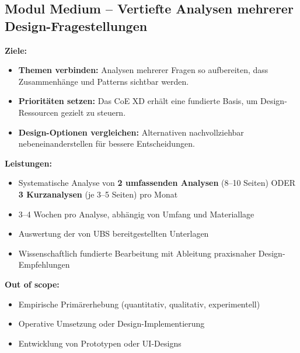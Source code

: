 \documentclass{fehradvice-report}
\begin{document}
\vspace{0.3cm}
\begin{center}
\end{center}

\newpage
\subsection{Modul Medium -- Vertiefte Analysen mehrerer Design-Fragestellungen}

\textbf{Ziele:}
\begin{itemize}
    \item[$\checkmark$] \textbf{Themen verbinden:} Analysen mehrerer Fragen so aufbereiten, dass Zusammenhänge und Patterns sichtbar werden.
    \item[$\checkmark$] \textbf{Prioritäten setzen:} Das CoE XD erhält eine fundierte Basis, um Design-Ressourcen gezielt zu steuern.
    \item[$\checkmark$] \textbf{Design-Optionen vergleichen:} Alternativen nachvollziehbar nebeneinanderstellen für bessere Entscheidungen.
\end{itemize}

\textbf{Leistungen:}
\begin{itemize}
    \item Systematische Analyse von \textbf{2 umfassenden Analysen} (8--10 Seiten) ODER \textbf{3 Kurzanalysen} (je 3--5 Seiten) pro Monat
    \item 3--4 Wochen pro Analyse, abhängig von Umfang und Materiallage
    \item Auswertung der von UBS bereitgestellten Unterlagen
    \item Wissenschaftlich fundierte Bearbeitung mit Ableitung praxisnaher Design-Empfehlungen
\end{itemize}

\textbf{Out of scope:}
\begin{itemize}
    \item[$\times$] Empirische Primärerhebung (quantitativ, qualitativ, experimentell)
    \item[$\times$] Operative Umsetzung oder Design-Implementierung
    \item[$\times$] Entwicklung von Prototypen oder UI-Designs
\end{itemize}
\end{document}
